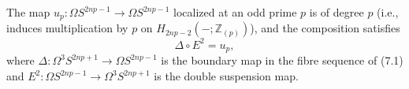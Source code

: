 The map $u_p \colon \Omega S^{2np-1} \to \Omega S^{2np-1}$ localized at an odd prime $p$ is of degree $p$ (i.e., induces multiplication by $p$ on $H_{2np-2}(-; \mathbb{Z}_{(p)})$), and the composition satisfies
$$\Delta \circ E^2 = u_p,$$
where $\Delta \colon \Omega^3 S^{2np+1} \to \Omega S^{2np-1}$ is the boundary map in the fibre sequence of (7.1) and $E^2 \colon \Omega S^{2np-1} \to \Omega^3 S^{2np+1}$ is the double suspension map.
